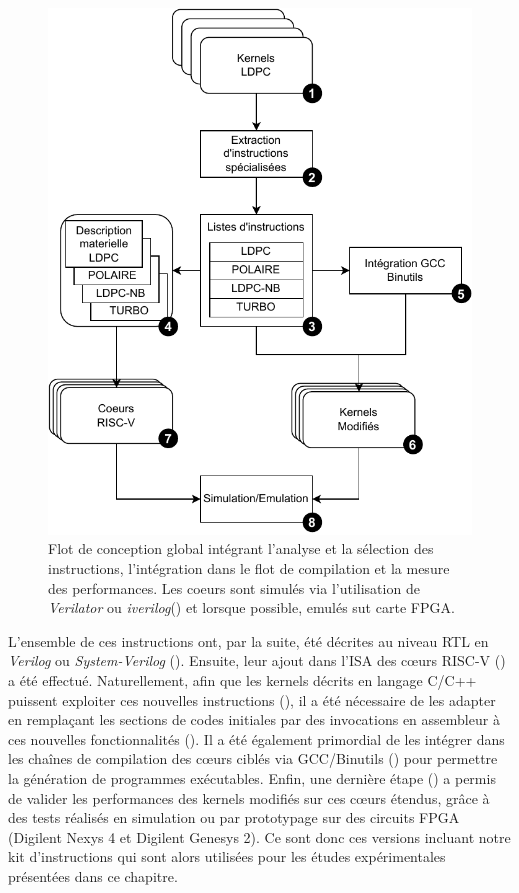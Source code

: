 \documentclass[../main.tex]{subfiles}
\begin{document}
\begin{figure}
\centering
\includegraphics[scale=1]{chapter3/figs/flot.pdf}
\caption{ Flot de conception global intégrant l'analyse et la sélection des instructions, l'intégration dans le flot de compilation et la mesure des performances.
Les coeurs sont simulés via l'utilisation de \textit{Verilator} ou \textit{iverilog}(\PicoRV) et lorsque possible, emulés sut carte FPGA.}
\label{flot}
\end{figure}

L'ensemble de ces instructions ont, par la suite, été décrites au niveau RTL en \textit{Verilog} ou \textit{System-Verilog} (). Ensuite, leur ajout dans l'ISA des cœurs RISC-V () \cite{ArchiRISC:V} a été effectué.
Naturellement, afin que les kernels décrits en langage C/C++ puissent exploiter ces nouvelles instructions (), il a été nécessaire de les adapter en remplaçant les sections de codes initiales par des invocations en assembleur à ces nouvelles fonctionnalités ().
Il a été également primordial de les intégrer dans les chaînes de compilation des cœurs ciblés via GCC/Binutils () pour permettre la génération de programmes exécutables.
Enfin, une dernière étape () a permis de valider les performances des kernels modifiés sur ces cœurs étendus, grâce à des tests réalisés en simulation ou par prototypage sur des circuits FPGA (Digilent Nexys 4 et Digilent Genesys 2).
Ce sont donc ces versions incluant notre kit d'instructions qui sont alors utilisées pour les études expérimentales présentées dans ce chapitre.
\end{document}
